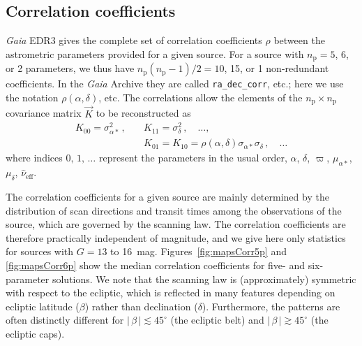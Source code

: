 \documentclass[longauth]{aa} %
\newcommand{\gacs}[1]{{\footnotesize\texttt{#1}}}
\begin{document}
\subsection{Correlation coefficients}
\label{sec:corr}

\textit{Gaia} EDR3 gives the complete set of correlation coefficients $\rho$ between 
the astrometric parameters provided for a given source. For a source with
$n_\text{p}=5$, 6, or 2 parameters, we thus have  
$n_\text{p}(n_\text{p}-1)/2=10$, 15, or 1 non-redundant coefficients.
In the \textit{Gaia} Archive they are called \gacs{ra\_dec\_corr}, etc.; here we use the notation
$\rho(\alpha,\delta)$, etc. The correlations allow the elements of the 
$n_\text{p}\times n_\text{p}$ covariance matrix $\vec{K}$ to be reconstructed as
\begin{equation}\label{eq:cov}
\begin{split}
K_{00} = \sigma_{\alpha*}^2\,, \quad
&K_{11} = \sigma_\delta^2\,, \quad\dots,\\
&K_{01} = K_{10} = \rho(\alpha,\delta)\sigma_{\alpha*}\sigma_\delta\,, \quad\dots
\end{split} 
\end{equation}
where indices $0,\,1,\,\dots$ represent the parameters in the usual order, 
$\alpha$, $\delta$, $\varpi$, $\mu_{\alpha*}$, $\mu_\delta$, $\hat{\nu}_\text{eff}$.

The correlation coefficients for a given source are mainly determined by the distribution 
of scan directions and transit times among the observations of the source, which are
governed by the scanning law. The correlation coefficients are therefore practically
independent of magnitude, and we give here only statistics for sources with $G=13$
to 16~mag.
Figures~\ref{fig:mapsCorr5p} and \ref{fig:mapsCorr6p}
show the median correlation coefficients for five- and six-parameter solutions.
We note that the scanning law is (approximately) symmetric with respect to the ecliptic, 
which is reflected in many features depending on ecliptic latitude ($\beta$) rather than 
declination ($\delta$). Furthermore, the patterns are often distinctly different
for $|\,\beta\,|\lesssim 45^\circ$ (the ecliptic belt) and $|\,\beta\,|\gtrsim 45^\circ$ 
(the ecliptic caps).
\end{document}
